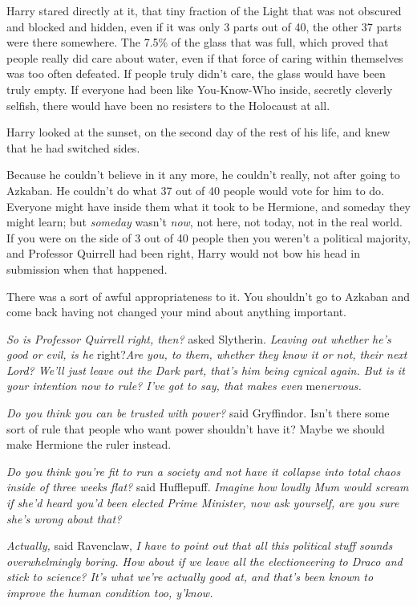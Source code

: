 Harry stared directly at it, that tiny fraction of the Light that was
not obscured and blocked and hidden, even if it was only 3 parts out of
40, the other 37 parts were there somewhere. The 7.5\% of the glass that
was full, which proved that people really did care about water, even if
that force of caring within themselves was too often defeated. If people
truly didn't care, the glass would have been truly empty. If everyone
had been like You-Know-Who inside, secretly cleverly selfish, there
would have been no resisters to the Holocaust at all.

Harry looked at the sunset, on the second day of the rest of his life,
and knew that he had switched sides.

Because he couldn't believe in it any more, he couldn't really, not
after going to Azkaban. He couldn't do what 37 out of 40 people would
vote for him to do. Everyone might have inside them what it took to be
Hermione, and someday they might learn; but \emph{someday} wasn't
\emph{now}, not here, not today, not in the real world. If you were on
the side of 3 out of 40 people then you weren't a political majority,
and Professor Quirrell had been right, Harry would not bow his head in
submission when that happened.

There was a sort of awful appropriateness to it. You shouldn't go to
Azkaban and come back having not changed your mind about anything
important.

\emph{So is Professor Quirrell right, then?} asked Slytherin.
\emph{Leaving out whether he's good or evil, is he} right?\emph{Are you,
to them, whether they know it or not, their next Lord? We'll just leave
out the Dark part, that's him being cynical again. But is it your
intention now to rule? I've got to say, that makes even}
me\emph{nervous.}

\emph{Do you think you can be trusted with power?} said Gryffindor.
Isn't there some sort of rule that people who want power shouldn't have
it? Maybe we should make Hermione the ruler instead.

\emph{Do you think you're fit to run a society and not have it collapse
into total chaos inside of three weeks flat?} said Hufflepuff.
\emph{Imagine how loudly Mum would scream if she'd heard you'd been
elected Prime Minister, now ask yourself, are you sure she's wrong about
that?}

\emph{Actually,} said Ravenclaw, \emph{I have to point out that all this
political stuff sounds overwhelmingly boring. How about if we leave all
the electioneering to Draco and stick to science? It's what we're
actually good at, and that's been known to improve the human condition
too, y'know.}

